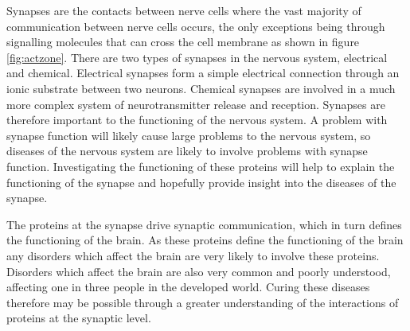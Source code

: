 Synapses are the contacts between nerve cells where the vast majority of communication between nerve cells occurs, the only exceptions being through signalling molecules that can cross the cell membrane as shown in figure \ref{fig:actzone}.
There are two types of synapses in the nervous system, electrical and chemical\autocite{kandel_principles_2000}.
Electrical synapses form a simple electrical connection through an ionic substrate between two neurons.
Chemical synapses are involved in a much more complex system of neurotransmitter release and reception.
Synapses are therefore important to the functioning of the nervous system. 
A problem with synapse function will likely cause large problems to the nervous system, so diseases of the nervous system are likely to involve problems with synapse function. %
Investigating the functioning of these proteins will help to explain the functioning of the synapse and hopefully provide insight into the diseases of the synapse\autocite{synsys}.%

The proteins at the synapse drive synaptic communication, which in turn defines the functioning of the brain.  %
As these proteins define the functioning of the brain any disorders which affect the brain are very likely to involve these proteins.  %
Disorders which affect the brain are also very common and poorly understood, affecting one in three people in the developed world. %
Curing these diseases therefore may be possible through a greater understanding of the interactions of proteins at the synaptic level\autocites{synsys,chua_architecture_2010}.

